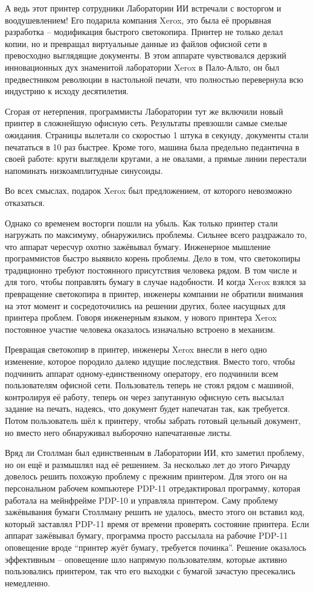 А ведь этот принтер сотрудники Лаборатории ИИ встречали с восторгом и воодушевлением! Его подарила компания Xerox, это была её прорывная разработка -- модификация быстрого светокопира. Принтер не только делал копии, но и превращал виртуальные данные из файлов офисной сети в превосходно выглядящие документы. В этом аппарате чувствовался дерзкий инновационных дух знаменитой лаборатории Xerox в Пало-Альто, он был предвестником революции в настольной печати, что полностью перевернула всю индустрию к исходу десятилетия.

Сгорая от нетерпения, программисты Лаборатории тут же включили новый принтер в сложнейшую офисную сеть. Результаты превзошли самые смелые ожидания. Страницы вылетали со скоростью 1 штука в секунду, документы стали печататься в 10 раз быстрее. Кроме того, машина была предельно педантична в своей работе: круги выглядели кругами, а не овалами, а прямые линии перестали напоминать низкоамплитудные синусоиды.

Во всех смыслах, подарок Xerox был предложением, от которого невозможно отказаться.

Однако со временем восторги пошли на убыль. Как только принтер стали нагружать по максимуму, обнаружились проблемы. Сильнее всего раздражало то, что аппарат чересчур охотно зажёвывал бумагу. Инженерное мышление программистов быстро выявило корень проблемы. Дело в том, что светокопиры традиционно требуют постоянного присутствия человека рядом. В том числе и для того, чтобы поправлять бумагу в случае надобности. И когда Xerox взялся за превращение светокопира в принтер, инженеры компании не обратили внимания на этот момент и сосредоточились на решении других, более насущных для принтера проблем. Говоря инженерным языком, у нового принтера Xerox постоянное участие человека оказалось изначально встроено в механизм.

Превращая светокопир в принтер, инженеры Xerox внесли в него одно изменение, которое породило далеко идущие последствия. Вместо того, чтобы подчинить аппарат одному-единственному оператору, его подчинили всем пользователям офисной сети. Пользователь теперь не стоял рядом с машиной, контролируя её работу, теперь он через запутанную офисную сеть высылал задание на печать, надеясь, что документ будет напечатан так, как требуется. Потом пользователь шёл к принтеру, чтобы забрать готовый цельный документ, но вместо него обнаруживал выборочно напечатанные листы.

Вряд ли Столлман был единственным в Лаборатории ИИ, кто заметил проблему, но он ещё и размышлял над её решением. За несколько лет до этого Ричарду довелось решить похожую проблему с прежним принтером. Для этого он на персональном рабочем компьютере PDP-11 отредактировал программу, которая работала на мейнфрейме PDP-10 и управляла принтером. Саму проблему зажёвывания бумаги Столлману решить не удалось, вместо этого он вставил код, который заставлял PDP-11 время от времени проверять состояние принтера. Если аппарат зажёвывал бумагу, программа просто рассылала на рабочие PDP-11 оповещение вроде \enquote{принтер жуёт бумагу, требуется починка}. Решение оказалось эффективным -- оповещение шло напрямую пользователям, которые активно пользовались принтером, так что его выходки с бумагой зачастую пресекались немедленно.


